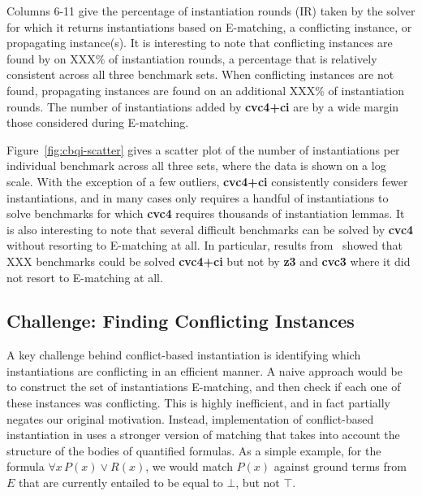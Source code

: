 \documentclass[oribibl]{llncs}
\begin{document}
Columns 6-11 give the percentage of instantiation rounds (IR) taken by the solver 
for which it returns instantiations based on E-matching, a conflicting instance,
or propagating instance(s).
It is interesting to note that conflicting instances are found by \cvc on
XXX\% of instantiation rounds, a percentage that is relatively consistent across all three benchmark sets.
When conflicting instances are not found, propagating instances are found on an additional XXX\% of instantiation rounds.
The number of instantiations added by {\bf cvc4+ci} are by a wide margin those considered during E-matching.

Figure~\ref{fig:cbqi-scatter} gives a scatter plot of the number of instantiations per individual benchmark
across all three sets, where the data is shown on a log scale.
With the exception of a few outliers, {\bf cvc4+ci} consistently considers fewer instantiations,
and in many cases only requires a handful of instantiations to solve benchmarks for which {\bf cvc4}
requires thousands of instantiation lemmas.
It is also interesting to note that several difficult benchmarks can be solved by {\bf cvc4}
without resorting to E-matching at all.
In particular, results from~\cite{ReynoldsTinelliMoura14} showed that XXX benchmarks could be solved {\bf cvc4+ci}
but not by {\bf z3} and {\bf cvc3} where it did not resort to E-matching at all.

\subsection{Challenge: Finding Conflicting Instances}
A key challenge behind conflict-based instantiation
is identifying which instantiations are conflicting in an efficient manner.
A naive approach would be to construct the set of instantiations E-matching, and then check if each one of these instances
was conflicting.
This is highly inefficient, and in fact partially negates our original motivation.
Instead, implementation of conflict-based instantiation in \cvc uses a stronger version of matching
that takes into account the structure of the bodies of quantified formulas.
As a simple example, for the formula $\forall x\, P( x ) \vee R( x )$, we would match
$P( x )$ against ground terms from $E$ that are currently entailed to be equal to $\bot$, but not $\top$.
\end{document}
